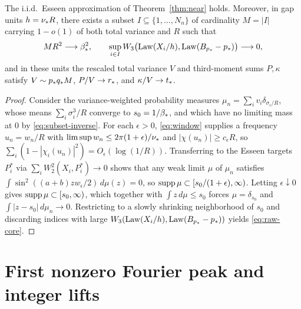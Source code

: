 \begin{proposition}\label{prop:core}
The i.i.d.\ Esseen approximation of Theorem~\ref{thm:near} holds. Moreover,
in gap units $h=\nu_* R$, there exists a subset $I\subseteq\{1,\ldots,N_n\}$
of cardinality $M=|I|$ carrying $1-o(1)$ of both total variance and $R$ such
that
\begin{equation}\label{eq:raw-core}
 M R^2\longrightarrow\beta_*^2,\qquad
 \sup_{i\in I}W_3\bigl(\operatorname{Law}(X_i/h),\operatorname{Law}(B_{p_*}-p_*)\bigr)\longrightarrow0,
\end{equation}
and in these units the rescaled total variance $V$ and third-moment sums
$P,\kappa$ satisfy $V\sim p_*q_* M$, $P/V\to r_*$, and $\kappa/V\to t_*$.
\end{proposition}
\begin{proof}
Consider the variance-weighted probability measures
$\mu_n=\sum_i v_i\delta_{\sigma_i/R}$, whose means $\sum_i\sigma_i^3/R$
converge to $s_0=1/\beta_*$, and which have no limiting mass at $0$ by
\eqref{eq:subset-inverse}. For each $\epsilon>0$, \eqref{eq:window} supplies
a frequency $u_n=w_n/R$ with $\limsup w_n\le2\pi(1+\epsilon)/\nu_*$ and
$|\chi(u_n)|\ge c_\epsilon R$, so $\sum_i(1-|\chi_i(u_n)|^2)=O_\epsilon(\log(1/R))$.
Transferring to the Esseen targets $P_i^*$ via $\sum_i W_2^2(X_i,P_i^*)\to0$
shows that any weak limit $\mu$ of $\mu_n$ satisfies
$\int\sin^2((a+b)zw_\epsilon/2)\,d\mu(z)=0$, so $\operatorname{supp}\mu\subset[s_0/(1+\epsilon),\infty)$.
Letting $\epsilon\downarrow0$ gives $\operatorname{supp}\mu\subset[s_0,\infty)$, which
together with $\int z\,d\mu\le s_0$ forces $\mu=\delta_{s_0}$ and
$\int|z-s_0|\,d\mu_n\to0$. Restricting to a slowly shrinking neighborhood of
$s_0$ and discarding indices with large $W_3(\operatorname{Law}(X_i/h),\operatorname{Law}(B_{p_*}-p_*))$
yields \eqref{eq:raw-core}.
\end{proof}

\section{First nonzero Fourier peak and integer lifts}\label{sec:alias}

